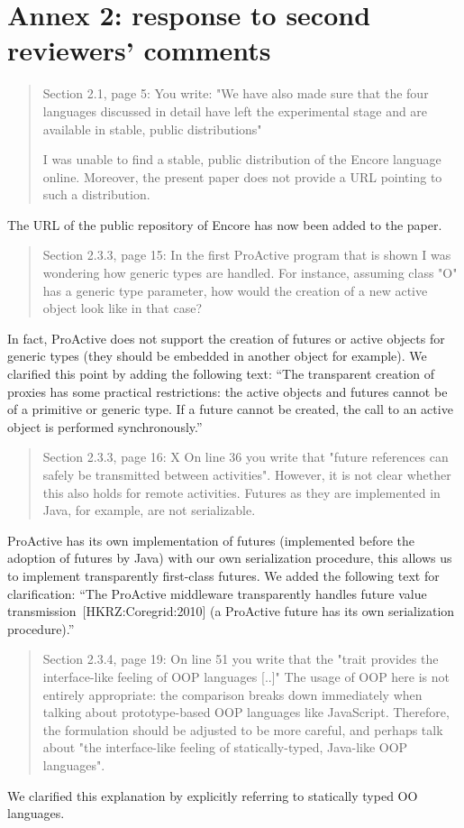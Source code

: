 \documentclass{article}
\begin{document}
\section*{Annex 2: response to second reviewers' comments}


\begin{quote}
	Section 2.1, page 5:
You write: "We have also made sure that the four languages discussed in detail have left 
the experimental stage and are available in stable, public distributions"

I was unable to find a stable, public distribution of the Encore language online. 
Moreover, the present paper does not provide a URL pointing to such a distribution.
\end{quote}
The URL of the public repository of Encore has now been added to the paper.

\begin{quote}
	Section 2.3.3, page 15:
In the first ProActive program that is shown I was wondering how generic types are 
handled. For instance, assuming class "O" has a generic type parameter, how would the 
creation of a new active object look like in that case?
\end{quote}
In fact, ProActive does not support the creation of futures or active objects for generic 
types (they should be embedded in another object for example). We clarified this point by 
adding the following text: ``The transparent creation of proxies has some
practical restrictions: the active objects and futures cannot be of a
primitive or generic type. If a future cannot be created, the call to
an active object is performed synchronously.''

\begin{quote}
	Section 2.3.3, page 16:
X On line 36 you write that "future references can safely be transmitted between 
activities". However, it is not clear whether this also holds for remote activities. 
Futures as they are implemented in Java, for example, are not serializable.
\end{quote}
ProActive has its own implementation of futures (implemented before the adoption of 
futures by Java) with our own serialization procedure, this allows us to implement 
transparently first-class futures. We added the following text for clarification:
``The ProActive middleware transparently handles future value
transmission~[HKRZ:Coregrid:2010] (a ProActive future has its own serialization 
procedure).''

\begin{quote}
	Section 2.3.4, page 19:
On line 51 you write that the "trait provides the interface-like feeling of OOP languages 
[..]" The usage of OOP here is not entirely appropriate: the comparison breaks down 
immediately when talking about prototype-based OOP languages like JavaScript. Therefore, 
the formulation should be adjusted to be more careful, and perhaps talk about "the 
interface-like feeling of statically-typed, Java-like OOP languages".
\end{quote}
We clarified this explanation by explicitly referring to statically typed OO languages.
\end{document}
